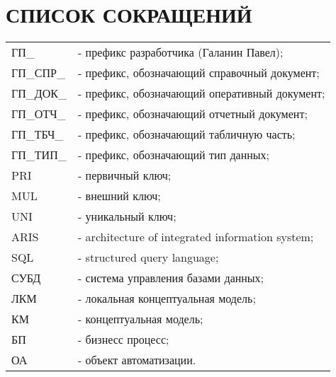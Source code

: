 {}
\section*{СПИСОК СОКРАЩЕНИЙ}

\begin{tabular}{p{2.5cm}l}
    ГП\_        & - префикс разработчика (Галанин Павел); \\
    ГП\_СПР\_   & - префикс, обозначающий справочный документ; \\
    ГП\_ДОК\_   & - префикс, обозначающий оперативный документ; \\
    ГП\_ОТЧ\_   & - префикс, обозначающий отчетный документ; \\
    ГП\_ТБЧ\_   & - префикс, обозначающий табличную часть; \\
    ГП\_ТИП\_   & - префикс, обозначающий тип данных; \\
    PRI         & - первичный ключ; \\
    MUL         & - внешний ключ; \\
    UNI         & - уникальный ключ; \\
    ARIS        & - architecture of integrated information system;\\
    SQL         & - structured query language;\\
    СУБД        & - система управления базами данных; \\
    ЛКМ         & - локальная концептуальная модель;\\ 
    КМ          & - концептуальная модель;\\
    БП          & - бизнесс процесс;\\
    ОА          & - объект автоматизации.\\
\end{tabular}

\newpage
